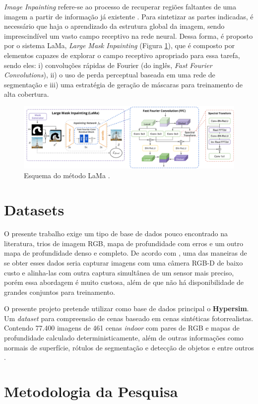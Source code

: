 \textit{Image Inpainting} refere-se ao processo de recuperar regiões faltantes de uma imagem a partir de informação já existente \cite{elharrouss2020image}. Para sintetizar as partes indicadas, é necessário que haja o aprendizado da estrutura global da imagem, sendo imprescindível um vasto campo receptivo na rede neural. Dessa forma, é proposto por \cite{suvorov2022resolution} o sistema LaMa, \textit{Large Mask Inpainting} (Figura \ref{lama}), que é composto por elementos capazes de explorar o campo receptivo apropriado para essa tarefa, sendo eles: i) convoluções rápidas de Fourier (do inglês, \textit{Fast Fourier Convolutions}), ii) o uso de perda perceptual baseada em uma rede de segmentação e iii) uma estratégia de geração de máscaras para treinamento de alta cobertura.

\begin{figure}[h]
    \centering
    \includegraphics[width=\textwidth]{fig/lama.png}
    \caption{Esquema do método LaMa \cite{suvorov2022resolution}.}
    \label{lama}
\end{figure}


\section{Datasets}

O presente trabalho exige um tipo de base de dados pouco encontrado na literatura, trios de imagem RGB, mapa de profundidade com erros e um outro mapa de profundidade denso e completo. De acordo com \cite{zhang2018deep}, uma das maneiras de se obter esses dados seria capturar imagens com uma câmera RGB-D de baixo custo e alinha-las com outra captura simultânea de um sensor mais preciso, porém essa abordagem é muito custosa, além de que não há disponibilidade de grandes conjuntos para treinamento.

O presente projeto pretende utilizar como base de dados principal o \textbf{Hypersim}. Um \textit{dataset} para compreensão de cenas baseado em cenas sintéticas fotorrealistas. Contendo 77.400 imagens de 461 cenas \textit{indoor} com pares de RGB e mapas de profundidade calculado deterministicamente, além de outras informações como normais de superfície, rótulos de segmentação e detecção de objetos e entre outros \cite{roberts2021hypersim}.

\section{Metodologia da Pesquisa}





